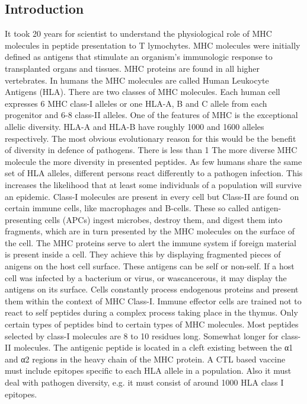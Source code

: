 \documentclass{bioinfo}
\begin{document}
\begin{application}
\section*{Introduction}
   
It took 20 years for scientist to understand the  physiological role of MHC molecules in peptide presentation to T lymochytes. 
MHC molecules were initially defined as antigens that stimulate an organism’s immunologic response to transplanted organs and tissues. MHC proteins are found in all higher vertebrates. 
In humans the MHC molecules are called Human Leukocyte Antigens (HLA).
There are two classes of MHC molecules. Each human cell expresses 6 MHC class-I alleles or one HLA-A, B and C allele from each progenitor and 6-8 class-II alleles.
One of the features of MHC is the exceptional allelic diversity. HLA-A and HLA-B have roughly 1000 and 1600 alleles respectively. 
The most obvious evolutionary reason for this would be the benefit of diversity in defence of pathogens. 
There is less than 1%
The more diverse MHC molecule the more diversity in presented peptides. As few humans share the same set of HLA alleles, different persons react differently to a pathogen infection. 
This increases the likelihood that at least some individuals of a population will survive an epidemic.
Class-I molecules are present in every cell but Class-II are found on certain immune cells, like macrophages and B-cells. 
These so called antigen-presenting cells (APCs) ingest microbes, destroy them, and digest them into fragments, which are in turn presented by the MHC molecules on the surface of the cell.
The MHC proteins serve to alert the immune system if foreign material is present inside a cell. 
They achieve this by displaying fragmented pieces of anigens on the host cell surface. These antigens can be self or non-self. 
If a host cell was infected by a bacterium or virus, or wascancerous, it may  display the antigens on its surface.
Cells constantly process endogenous proteins and present them within the context of MHC Class-I. 
Immune effector cells are trained not to react to self peptides during a complex process taking place in the thymus.
Only certain types of peptides bind to certain types of MHC molecules. Most peptides selected by class-I molecules are 8 to 10 residues long. 
Somewhat longer for class-II molecules. The antigenic peptide is located in a cleft existing between the α1 and α2 regions in the heavy chain of the MHC protein.
A CTL based vaccine must include epitopes specific to each HLA allele in a population. Also it must deal with pathogen diversity, e.g. it must consist of around 1000 HLA class I epitopes. 

\end{application}
\end{document}
